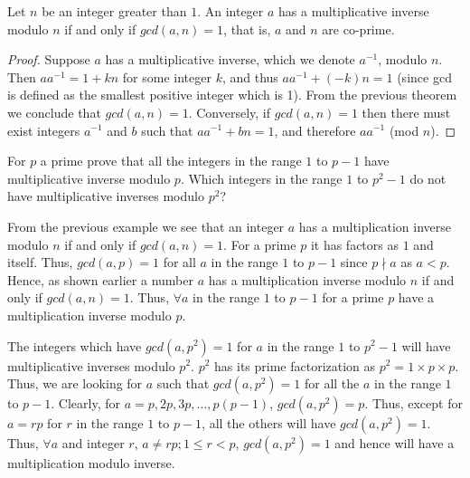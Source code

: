 \begin{corollary}
    Let $n$ be an integer greater than $1$. An integer $a$ has a multiplicative inverse modulo $n$ if and only if $gcd(a,n) =1$, that is, $a$ and $n$ are co-prime.
\end{corollary}
\begin{proof}
    Suppose $a$ has a multiplicative inverse, which we denote $a^{-1}$, modulo $n$. Then $aa^{-1}=1+kn$ for some integer $k$, and thus $aa^{-1}+(-k)n=1$ (since gcd is defined as the smallest positive integer which is 1). From the previous theorem we conclude that $gcd(a,n)=1$. Conversely, if $gcd(a,n)=1$ then there must exist integers $a^{-1}$ and $b$ such that $aa^{-1} + bn=1$, and therefore $aa^{-1}$ (mod $n$).
\end{proof}

\begin{example}
    For $p$ a prime prove that all the integers in the range $1$ to $p-1$ have multiplicative inverse modulo $p$. Which integers in the range $1$ to $p^2-1$ do not have multiplicative inverses modulo $p^2$?
    
    From the previous example we see that an integer $a$ has a multiplication inverse modulo $n$ if and only if $gcd(a,n)=1$. For a prime $p$ it has factors as $1$ and itself. Thus, $gcd(a,p)=1$ for all $a$ in the range $1$ to $p-1$ since $p\nmid a$ as $a<p$. Hence, as shown earlier a number $a$ has a multiplication inverse modulo $n$ if and only if $gcd(a,n)=1$. Thus, $\forall a$ in the range $1$ to $p-1$ for a prime $p$ have a multiplication inverse modulo $p$.
    
    The integers which have $gcd(a,p^2)=1$ for $a$ in the range $1$ to $p^2-1$ will have multiplicative inverses modulo $p^2$. $p^2$ has its prime factorization as $p^2 = 1 \times p\times p$. Thus, we are looking for $a$ such that $gcd(a,p^2)=1$ for all the $a$ in the range $1$ to $p-1$. Clearly, for $a=p,2p,3p,\ldots, p(p-1)$, $gcd(a,p^2) =p$. Thus, except for $a=rp$ for $r$ in the range $1$ to $p-1$, all the others will have $gcd(a,p^2)=1$. Thus, $\forall a$ and integer $r$, $a \neq rp; 1\leq r <p$, $gcd(a,p^2)=1$ and hence will have a multiplication modulo inverse.
\end{example}

